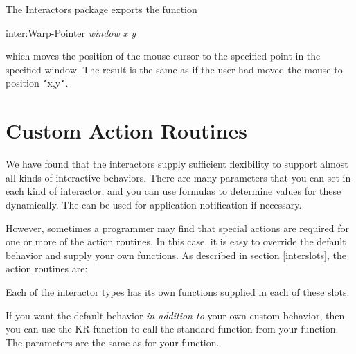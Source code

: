 The Interactors package exports the function
\begin{programexample}
inter:Warp-Pointer {\it window x y}\value{function}
\end{programexample}
which moves the position of the mouse cursor to the specified point
in the specified window.  The result is the same as if the user had moved
the mouse to position {\tt\char`\<}x,y{\tt\char`\>}.



\section{Custom Action Routines}
\label{customroutines}

We have found that the interactors supply sufficient flexibility to support
almost all kinds of interactive behaviors.  There are many parameters that
you can set in each kind of interactor, and you can use formulas
to determine values for these dynamically.  The  can be used for
application notification if necessary.

However, sometimes a programmer may find that special actions are required
for one or more of the action routines.  In this case, it is easy to
override the default behavior and supply your own functions.  As described
in section \ref{interslots}, the action routines are:
\begin{description}
\item[] 

\item[] 

\item[] 

\item[] 

\item[] 

\item[] 
\end{description}

Each of the interactor types has its own functions supplied in each of
these slots.

If you want the default behavior {\it in addition to} your own custom behavior, then
you can use the KR function  to call the standard
function from your function.  The parameters are the same as for your function.

